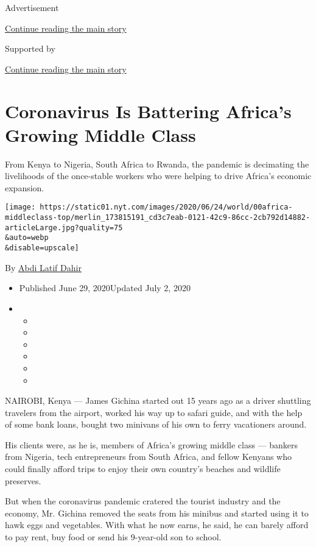 Advertisement

\protect\hyperlink{after-top}{Continue reading the main story}

Supported by

\protect\hyperlink{after-sponsor}{Continue reading the main story}

\hypertarget{coronavirus-is-battering-africas-growing-middle-class}{%
\section{Coronavirus Is Battering Africa's Growing Middle
Class}\label{coronavirus-is-battering-africas-growing-middle-class}}

From Kenya to Nigeria, South Africa to Rwanda, the pandemic is
decimating the livelihoods of the once-stable workers who were helping
to drive Africa's economic expansion.

\texttt{[image: https://static01.nyt.com/images/2020/06/24/world/00africa-middleclass-top/merlin\_173815191\_cd3c7eab-0121-42c9-86cc-2cb792d14882-articleLarge.jpg?quality=75\\\&auto=webp\\\&disable=upscale]}

By \href{https://www.nytimes.com/by/abdi-latif-dahir}{Abdi Latif Dahir}

\begin{itemize}
\item
  Published June 29, 2020Updated July 2, 2020
\item
  \begin{itemize}
  \item
  \item
  \item
  \item
  \item
  \item
  \end{itemize}
\end{itemize}

NAIROBI, Kenya --- James Gichina started out 15 years ago as a driver
shuttling travelers from the airport, worked his way up to safari guide,
and with the help of some bank loans, bought two minivans of his own to
ferry vacationers around.

His clients were, as he is, members of Africa's growing middle class ---
bankers from Nigeria, tech entrepreneurs from South Africa, and fellow
Kenyans who could finally afford trips to enjoy their own country's
beaches and wildlife preserves.

But when the coronavirus pandemic cratered the tourist industry and the
economy, Mr. Gichina removed the seats from his minibus and started
using it to hawk eggs and vegetables. With what he now earns, he said,
he can barely afford to pay rent, buy food or send his 9-year-old son to
school.

